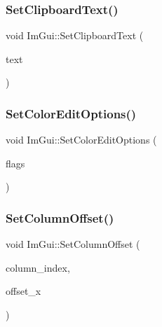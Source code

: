 \mbox{\label{namespace_im_gui_aa4824a1b351c063b4aff9b9f4fb5fd4d}} 
\subsubsection{\texorpdfstring{Set\+Clipboard\+Text()}{SetClipboardText()}}
{\footnotesize\ttfamily void Im\+Gui\+::\+Set\+Clipboard\+Text (\begin{DoxyParamCaption}\item[{const char $\ast$}]{text }\end{DoxyParamCaption})}

\mbox{\label{namespace_im_gui_ac768151f2ac6c7d79b31b934cc0e9d05}} 
\subsubsection{\texorpdfstring{Set\+Color\+Edit\+Options()}{SetColorEditOptions()}}
{\footnotesize\ttfamily void Im\+Gui\+::\+Set\+Color\+Edit\+Options (\begin{DoxyParamCaption}\item[{\mbox{\hyperlink{imgui_8h_a6b2d5e95adc38f22c021252189f669c6}{Im\+Gui\+Color\+Edit\+Flags}}}]{flags }\end{DoxyParamCaption})}

\mbox{\label{namespace_im_gui_a8cc207211d6cf3f77b505e24aed4ebcc}} 
\subsubsection{\texorpdfstring{Set\+Column\+Offset()}{SetColumnOffset()}}
{\footnotesize\ttfamily void Im\+Gui\+::\+Set\+Column\+Offset (\begin{DoxyParamCaption}\item[{int}]{column\+\_\+index,  }\item[{float}]{offset\+\_\+x }\end{DoxyParamCaption})}

